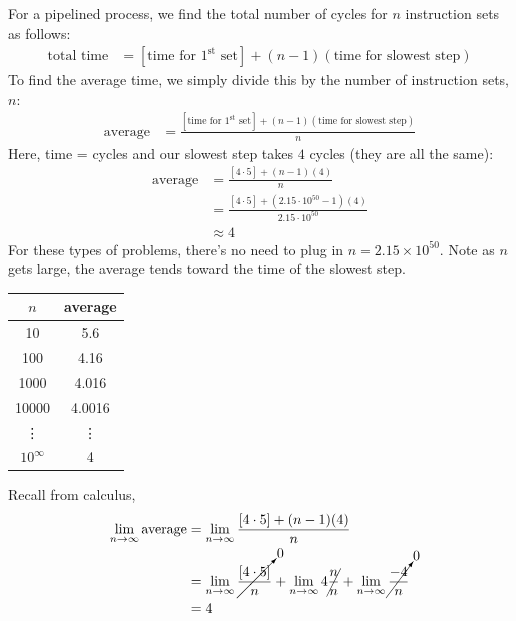 \documentclass{exam}
\begin{document}
\begin{questions}
		\begin{solution}
		    For a pipelined process, we find the total number of cycles for $n$ instruction sets as follows:
    		    \begin{align}
    		        \text{total time} &= [\text{time for $1^{\text{st}}$ set}]+(n-1)(\text{time for slowest step})
    		    \end{align}
		    To find the average time, we simply divide this by the number of instruction sets, $n$:
    		    \begin{align}
    		        \text{average} &= \frac{[\text{time for $1^{\text{st}}$ set}]+(n-1)(\text{time for slowest step})}{n}
    		    \end{align}
		    Here, time = cycles and our slowest step takes $4$ cycles (they are all the same): 
    		    \begin{align}
    		        \text{average} &= \frac{[4\cdot 5]+(n-1)(4)}{n}\\
    		                       &= \frac{[4\cdot 5]+(2.15\cdot 10^{50}-1)(4)}{2.15\cdot 10^{50}}\\
    		                       &\approx 4
    		    \end{align}
    		For these types of problems, there's no need to plug in $n=2.15\times 10^{50}$. Note as $n$ gets large, the average tends toward the time of the slowest step.\\
            \begin{center}
            \hspace{20pt}\begin{tabular}{ c|c } 
                 $n$ & average \\ 
                 \hline
                 10 & 5.6 \\ 
                 100 & 4.16 \\ 
                 1000 & 4.016 \\ 
                 10000 & 4.0016 \\ 
                 \vdots & \vdots \\ 
                 $10^{\infty}$ & 4 \\ 
            \end{tabular}
            \end{center}
            Recall from calculus,
            \begin{align}
    		        \lim_{n\rightarrow\infty}\text{average}
    		        &=\lim_{n\rightarrow\infty} \frac{[4\cdot 5]+(n-1)(4)}{n}\\
    		        &=\lim_{n\rightarrow\infty}\cancelto{0}{\frac{[4\cdot 5]}{n}}
    		        +\lim_{n\rightarrow\infty}4\cancel{\frac{n}{n}}
    		        +\lim_{n\rightarrow\infty}\cancelto{0}{\frac{-4}{n}}\\
    		        &= 4
    		    \end{align}
    		

\end{solution}
\end{questions}
\end{document}
